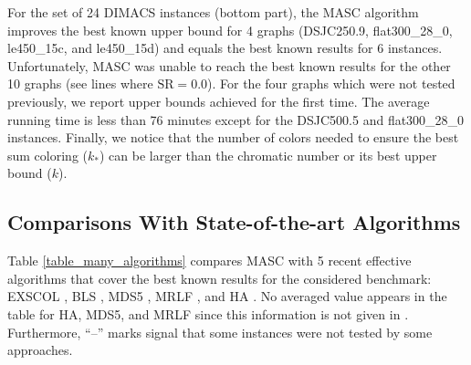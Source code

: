 \documentclass{elsart}
\begin{document}
For the set of 24 DIMACS instances (bottom part), the MASC algorithm improves the best known upper bound for 4 graphs (DSJC250.9, flat300\_28\_0, le450\_15c, and le450\_15d) and equals the best known results for 6 instances. Unfortunately, MASC was unable to reach the best known results for the other 10 graphs (see lines where $\textrm{SR} = 0.0$). For the four graphs which were not tested previously, we report upper bounds achieved for the first time. The average running time is less than 76 minutes except for the DSJC500.5 and flat300\_28\_0 instances. Finally, we notice that the number of colors needed to ensure the best sum coloring ($k_*$) can be larger than the chromatic number or its best upper bound ($k$).

\subsection{Comparisons With State-of-the-art Algorithms}
\label{subsec_comparison_results}

Table \ref{table_many_algorithms} compares MASC with 5 recent effective algorithms that cover the best known results for the considered benchmark: EXSCOL \cite{Wu&Hao2012}, BLS \cite{Benlic&Hao2012}, MDS5 \cite{Helmar&Chiarandini2011}, MRLF \cite{Li&al2009}, and HA \cite{Douiri&Elbernoussi2011}. No averaged value appears in the table for HA, MDS5, and MRLF since this information is not given in \cite{Douiri&Elbernoussi2011,Helmar&Chiarandini2011,Li&al2009}. Furthermore, ``--'' marks signal that some instances were not tested by some approaches.
\end{document}
